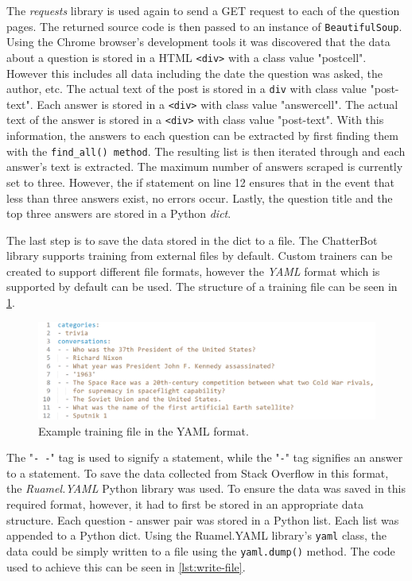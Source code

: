 \documentclass[12pt,a4paper]{article}
\newcommand{\captionstyle}[1] {
    \small{#1}
}
\begin{document}
The \textit{requests} library is used again to send a GET request to each of the question pages. The returned source code is then passed to an instance of \texttt{BeautifulSoup}. Using the Chrome browser's development tools it was discovered that the data about a question is stored in a HTML \texttt{<div>} with a class value "postcell". However this includes all data including the date the question was asked, the author, etc. The actual text of the post is stored in a \texttt{div} with class value "post-text". Each answer is stored in a \texttt{<div>} with class value "answercell". The actual text of the answer is stored in a \texttt{<div>} with class value "post-text". With this information, the answers to each question can be extracted by first finding them with the \texttt{find\_all() method}. The resulting list is then iterated through and each answer's text is extracted. The maximum number of answers scraped is currently set to three. However, the if statement on line 12 ensures that in the event that less than three answers exist, no errors occur. Lastly, the question title and the top three answers are stored in a Python \textit{dict}.

The last step is to save the data stored in the dict to a file. The ChatterBot library supports training from external files by default. Custom trainers can be created to support different file formats, however the \textit{YAML} format which is supported by default can be used. The structure of a training file can be seen in \cref{fig:yaml-train}. 

\begin{figure}[!htb]%
    \centering
    \includegraphics[width=1.0\columnwidth]{yaml-train}%
    \caption{\captionstyle{Example training file in the YAML format.}}%
    \label{fig:yaml-train}%
\end{figure}

The "\verb|- -|" tag is used to signify a statement, while the "\verb|-|" tag signifies an answer to a statement. To save the data collected from Stack Overflow in this format, the \textit{Ruamel.YAML} Python library was used. To ensure the data was saved in this required format, however, it had to first be stored in an appropriate data structure. Each question - answer pair was stored in a Python list. Each list was appended to a Python dict. Using the Ruamel.YAML library's \texttt{yaml} class, the data could be simply written to a file using the \texttt{yaml.dump()} method. The code used to achieve this can be seen in \cref{lst:write-file}.
\end{document}
